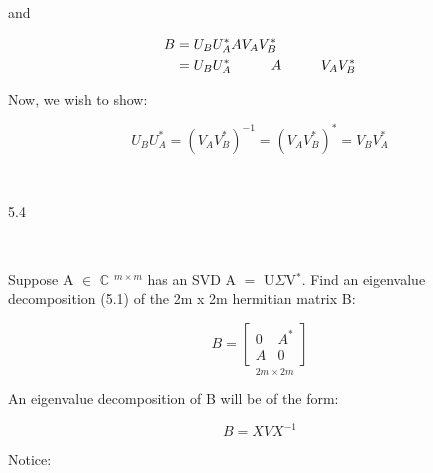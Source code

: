 \documentclass[12pt]{article}
\newcommand{\mt}[1]{\ensuremath{#1}}
\newcommand{\bc}{\mt{\mathbb{C}} }       %
\newcommand{\mem}{\mt{\in} }
\newcommand{\eql}{\mt{=} }
\newcommand{\uf}[2]{#1\mt{^{#2}}}
\newcommand{\splt}[1]{\begin{split}#1\end{split}}
\newcommand\tab[1][1cm]{\hspace*{#1}}
\begin{document}
and

\begin{displaymath}
\splt{
B & = U_B U^*_A A V_A V^*_B \\
 & = U_B U^*_A \tab A \tab V_A V^*_B
}
\end{displaymath}

Now, we wish to show:

\begin{displaymath}
  U_B U^*_A = (V_A V^*_B)^{-1} = (V_A V^*_B)^* = V_B V_A^*
\end{displaymath}


\

5.4

\

Suppose A \mem \uf{\bc}{m \times m} has an SVD A \eql U$\Sigma$\uf{V}{*}. Find an eigenvalue decomposition (5.1) of the 2m x 2m hermitian matrix B:

\begin{displaymath}
  B = \underset{2m \times 2m}{
\begin{bmatrix}
   0 & A^* \\
   A & 0 
  \end{bmatrix}
}
\end{displaymath}

An eigenvalue decomposition of B will be of the form:

\begin{displaymath}
  B = XVX^{-1}
\end{displaymath}

Notice:
\end{document}
